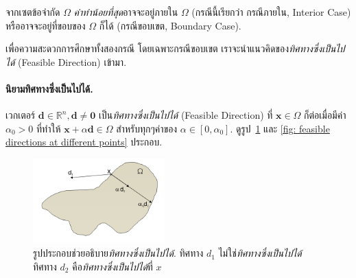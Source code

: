 จากเซตข้อจำกัด $\Omega$ \textit{ค่าทำน้อยที่สุด}อาจจะอยู่ภายใน $\Omega$ (กรณีนี้เรียกว่า กรณีภายใน,  Interior Case) หรืออาจจะอยู่ที่ขอบของ $\Omega$ ก็ได้ (กรณีขอบเขต, Boundary Case).

เพื่อความสะดวกการศึกษาทั้งสองกรณี โดยเฉพาะกรณีขอบเขต เราจะนำแนวคิดของ\textit{ทิศทางซึ่งเป็นไปได้} 
(Feasible Direction) เข้ามา.

\paragraph{นิยามทิศทางซึ่งเป็นไปได้.}
เวกเตอร์ $\mathbf{d} \in \mathbb{R}^n, \mathbf{d} \neq \mathbf{0}$ เป็น\textit{ทิศทางซึ่งเป็นไปได้} 
(Feasible Direction) ที่ $\mathbf{x} \in \Omega$ ก็ต่อเมื่อมีค่า $\alpha_0 > 0$ ที่ทำให้ $\mathbf{x} + \alpha \mathbf{d} \in \Omega$ สำหรับทุกๆค่าของ $\alpha \in [0, \alpha_0]$.
%
ดูรูป~\ref{fig: feasible direction} และ \ref{fig: feasible directions at different points} ประกอบ.

%
\begin{figure}
\begin{center}
\includegraphics[width=2.0in]
{02Background/feasibleDirection01.png}
\end{center}
\caption{รูปประกอบช่วยอธิบาย\textit{ทิศทางซึ่งเป็นไปได้}. 
ทิศทาง $d_1$ ไม่ใช่\textit{ทิศทางซึ่งเป็นไปได้} 
ทิศทาง $d_2$ คือ\textit{ทิศทางซึ่งเป็นไปได้}ที่ $x$}
\label{fig: feasible direction}
\end{figure}
%


